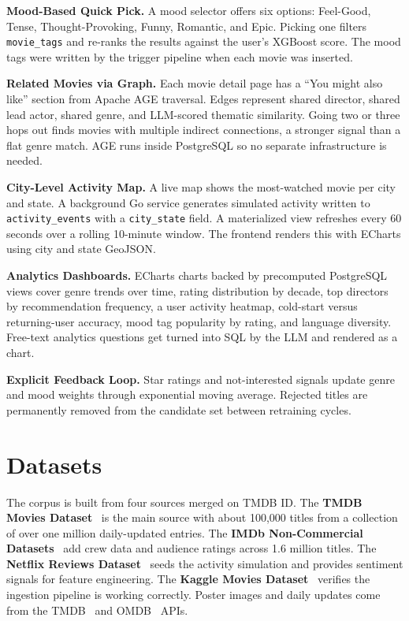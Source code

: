 \documentclass[conference]{IEEEtran}
\begin{document}
\textbf{Mood-Based Quick Pick.} A mood selector offers six options: Feel-Good, Tense, Thought-Provoking, Funny, Romantic, and Epic. Picking one filters \texttt{movie\_tags} and re-ranks the results against the user's XGBoost score. The mood tags were written by the trigger pipeline when each movie was inserted.

\textbf{Related Movies via Graph.} Each movie detail page has a ``You might also like'' section from Apache AGE traversal. Edges represent shared director, shared lead actor, shared genre, and LLM-scored thematic similarity. Going two or three hops out finds movies with multiple indirect connections, a stronger signal than a flat genre match. AGE runs inside PostgreSQL so no separate infrastructure is needed.

\textbf{City-Level Activity Map.} A live map shows the most-watched movie per city and state. A background Go service generates simulated activity written to \texttt{activity\_events} with a \texttt{city\_state} field. A materialized view refreshes every 60 seconds over a rolling 10-minute window. The frontend renders this with ECharts using city and state GeoJSON.

\textbf{Analytics Dashboards.} ECharts charts backed by precomputed PostgreSQL views cover genre trends over time, rating distribution by decade, top directors by recommendation frequency, a user activity heatmap, cold-start versus returning-user accuracy, mood tag popularity by rating, and language diversity. Free-text analytics questions get turned into SQL by the LLM and rendered as a chart.

\textbf{Explicit Feedback Loop.} Star ratings and not-interested signals update genre and mood weights through exponential moving average. Rejected titles are permanently removed from the candidate set between retraining cycles.

\section{Datasets}

The corpus is built from four sources merged on TMDB ID. The \textbf{TMDB Movies Dataset}~\cite{tmdb_dataset} is the main source with about 100,000 titles from a collection of over one million daily-updated entries. The \textbf{IMDb Non-Commercial Datasets}~\cite{imdb_official} add crew data and audience ratings across 1.6 million titles. The \textbf{Netflix Reviews Dataset}~\cite{netflix_reviews} seeds the activity simulation and provides sentiment signals for feature engineering. The \textbf{Kaggle Movies Dataset}~\cite{kaggle_movies} verifies the ingestion pipeline is working correctly. Poster images and daily updates come from the TMDB~\cite{tmdb} and OMDB~\cite{omdb} APIs.
\end{document}
